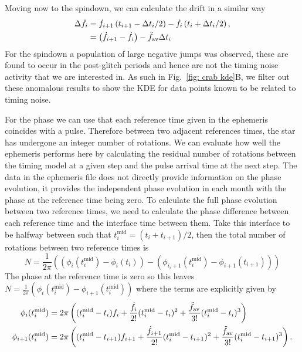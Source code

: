 \documentclass[../full_thesis/full_thesis.tex]{subfiles}
\newcommand{\tmid}{t^{\textrm{mid}}_{i}}
\begin{document}
Moving now to the spindown, we can calculate the drift in a similar way
\begin{align}
\Delta\dot{f}_{i} & = \dot{f}_{i+1}\left(t_{i+1}-\Delta t_{i}/2\right) -  \dot{f}_{i}\left(t_{i}+\Delta t_{i}/2\right), \\
& = \left(\dot{f}_{i+1}-\dot{f}_{i}\right) -  \ddot{f}_{\textrm{av}} \Delta t_{i}
\label{eqn: crab spindown residuals}
\end{align}
For the spindown a population of large negative jumps was observed, these are
found to occur in the post-glitch periods and hence are not the timing noise
activity that we are interested in. As such in Fig.~\ref{fig: crab kde}B, we
filter out these anomalous results to show the KDE for data points known to be
related to timing noise.

For the phase we can use that each reference time given in the ephemeris
coincides with a pulse. Therefore between two adjacent references times, the
star has undergone an integer number of rotations. We can evaluate how well the
ephemeris performs here by calculating the residual number of rotations between
the timing model at a given step and the pulse arrival time at the next step.
The data in the ephemeris file does not directly provide information on the
phase evolution, it provides the independent phase evolution in each month with
the phase at the reference time being zero. To calculate the full phase
evolution between two reference times, we need to calculate the phase
difference between each reference time and the interface time between them.
Take this interface to be halfway between such that $\tmid=(t_{i} +
t_{i+1})/2$, then the total number of rotations between two reference times is
\begin{equation}
    N = \frac{1}{2\pi}\left(\left(\phi_{i}(\tmid) - \phi_{i}(t_{i})\right) -
    \left(\phi_{i_i+1}(\tmid) - \phi_{i+1}(t_{i+1})\right)\right)
\end{equation}
The phase at the reference time is zero so this leaves $N =
\frac{1}{2\pi}\left(\phi_{i}(\tmid) - \phi_{i+1}(\tmid)\right)$ where the terms
are explicitly given by
\begin{align}
\phi_{i}(\tmid) & = 2\pi\left((\tmid - t_{i})\f_{i} +  \frac{\dot{\f}_{i}}{2!}(\tmid - t_{i})^{2}+\frac{\fddotav}{3!}(\tmid - t_{i})^{3}\right) \\
\phi_{i+1}(\tmid) & = 2\pi\left((\tmid - t_{i+1})\f_{i+1} +  \frac{\dot{\f}_{i+1}}{2!}(\tmid - t_{i+1})^{2}+\frac{\fddotav}{3!}(\tmid - t_{i+1})^{3}\right) .
\end{align}
\end{document}
